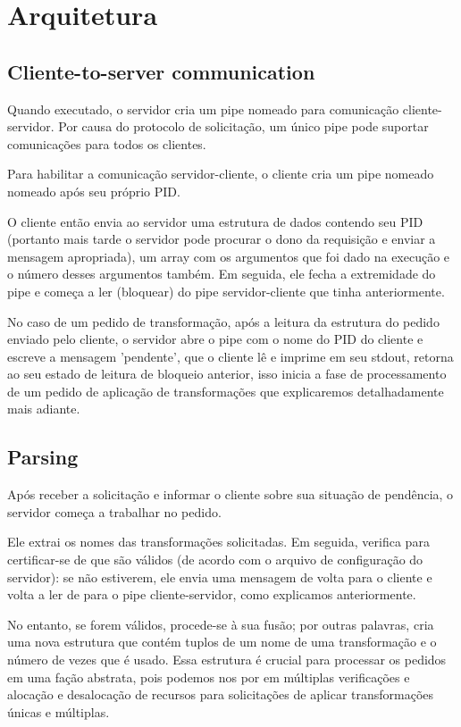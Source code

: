 \documentclass[a4paper]{report}
\begin{document}
	\chapter{Arquitetura}
	\section{Cliente-to-server communication}
	Quando executado, o servidor cria um pipe nomeado para comunicação cliente-servidor. Por causa do protocolo de solicitação, um único pipe pode suportar comunicações para todos os clientes. 
	
	Para habilitar a comunicação servidor-cliente, o cliente cria um pipe nomeado nomeado após seu próprio PID. 

    O cliente então envia ao servidor uma estrutura de dados contendo seu PID (portanto mais tarde o servidor pode procurar o dono da requisição e enviar a mensagem apropriada), um array com os argumentos que foi dado na execução e o número desses argumentos também. Em seguida, ele fecha a extremidade do pipe e começa a ler (bloquear) do pipe servidor-cliente que tinha anteriormente.

    No caso de um pedido de transformação, após a leitura da estrutura do pedido enviado pelo cliente, o
    servidor abre o pipe com o nome do PID do cliente e escreve a mensagem 'pendente', que o cliente lê e imprime em seu stdout, retorna ao seu estado de leitura de bloqueio anterior, isso inicia a fase de processamento de um pedido de aplicação de transformações que explicaremos detalhadamente mais adiante.
    \newpage
    \section{Parsing}
    
    Após receber a solicitação e informar o cliente sobre sua situação de pendência, o servidor começa a trabalhar no pedido.
    
    Ele extrai os nomes das transformações solicitadas. Em seguida, verifica para certificar-se de que são válidos (de acordo com o arquivo de configuração do servidor): se não estiverem, ele envia uma mensagem de volta para o cliente e volta a ler de para o pipe cliente-servidor, como explicamos anteriormente. 
    
    No entanto, se forem válidos, procede-se à sua fusão; por outras palavras, cria uma nova estrutura que contém tuplos de um nome de uma transformação e o número de vezes que é usado. Essa estrutura é crucial para processar os pedidos em uma fação abstrata, pois podemos nos por em múltiplas verificações e alocação e desalocação de recursos para solicitações de aplicar transformações únicas e múltiplas.
    
\end{document}
